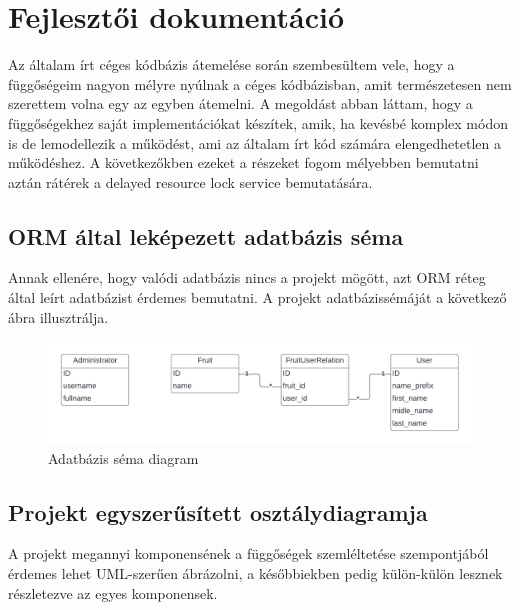 \chapter{Fejlesztői dokumentáció}
\label{ch:impl}

Az általam írt céges kódbázis átemelése során szembesültem vele, hogy a függőségeim nagyon mélyre nyúlnak a céges kódbázisban, amit természetesen nem szerettem volna egy az egyben átemelni. A megoldást abban láttam, hogy a függőségekhez saját implementációkat készítek, amik, ha kevésbé komplex módon is de lemodellezik a működést, ami az általam írt kód számára elengedhetetlen a működéshez. A következőkben ezeket a részeket fogom mélyebben bemutatni aztán rátérek a delayed resource lock service bemutatására.

\section{ORM által leképezett adatbázis séma}

Annak ellenére, hogy valódi adatbázis nincs a projekt mögött, azt ORM réteg által leírt adatbázist érdemes bemutatni. A projekt adatbázissémáját a következő ábra illusztrálja.

\begin{figure}[H]
	\centering
	\includegraphics[width=1\textwidth]{images/db_scheme.png}
	\caption{Adatbázis séma diagram}
	\label{fig:main_window}
\end{figure}

\section{Projekt egyszerűsített osztálydiagramja}

A projekt megannyi komponensének a függőségek szemléltetése szempontjából érdemes lehet UML-szerűen ábrázolni, a későbbiekben pedig külön-külön lesznek részletezve az egyes komponensek.

